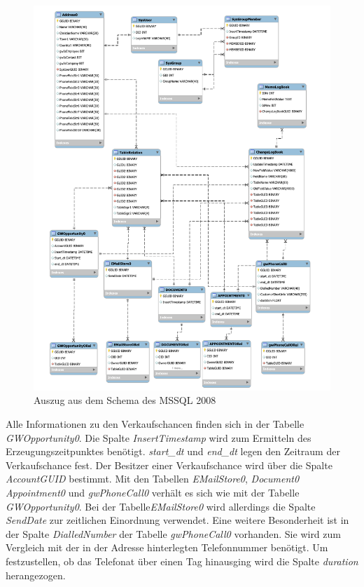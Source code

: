 \begin{figure}[H]
	\centering
  \includegraphics[width=1.0\textwidth]{pics/schema_alt.pdf}
	\caption{Auszug aus dem Schema des MSSQL 2008}
	\label{gw_schema_alt}
\end{figure}

Alle Informationen zu den Verkaufschancen finden sich in der Tabelle \textit{GWOpportunity0}. Die Spalte \textit{InsertTimestamp} wird zum Ermitteln des Erzeugungszeitpunktes benötigt. \textit{start\_dt} und \textit{end\_dt} legen den Zeitraum der Verkaufschance fest. Der Besitzer einer Verkaufschance wird über die Spalte \textit{AccountGUID} bestimmt. Mit den Tabellen \textit{EMailStore0}, \textit{Document0} \textit{Appointment0} und \textit{gwPhoneCall0} verhält es sich wie mit der Tabelle \textit{GWOpportunity0}. Bei der Tabelle\textit{EMailStore0} wird allerdings die Spalte \textit{SendDate} zur zeitlichen Einordnung verwendet. Eine weitere Besonderheit ist in der Spalte \textit{DialledNumber} der Tabelle \textit{gwPhoneCall0} vorhanden. Sie wird zum Vergleich mit der in der Adresse hinterlegten Telefonnummer benötigt. Um festzustellen, ob das Telefonat über einen Tag hinausging wird die Spalte \textit{duration} herangezogen.

